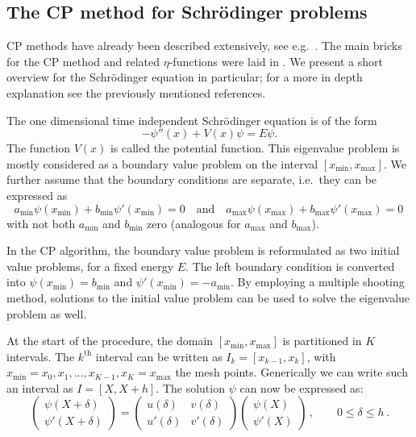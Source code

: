 \subsection{The CP method for Schrödinger problems}\label{the-method}

CP methods have already been described extensively, see e.g.\ \cite{ixaru_numerical_1984,ixaru_cp_1998,ixaru_cp_2000,ledoux_cp_2004}. The main bricks for the CP method and related $\eta$-functions were laid in \cite{ixaru_numerical_1984}. We present a short overview for the Schrödinger equation in particular; for a more in depth explanation see the previously mentioned references.

The one dimensional time independent Schrödinger equation is of the form
\[
    -\psi''(x) + V(x)\psi = E\psi\text{.}
\] The function $V(x)$ is called the potential function.
This eigenvalue problem is mostly considered as a boundary value problem on
the interval \([x_\text{min}, x_\text{max}]\). We further assume that the boundary
conditions are separate, i.e.\ they can be expressed as
\[
    a_\text{min} \psi(x_\text{min}) + b_\text{min}\psi'(x_\text{min}) = 0
    \quad \mbox{and} \quad
    a_\text{max} \psi(x_\text{max}) + b_\text{max}\psi'(x_\text{max}) = 0\,
\]
with not both $a_\text{min}$ and $b_\text{min}$ zero (analogous for $a_\text{max}$ and $b_\text{max}$).

In the CP algorithm, the boundary value problem is reformulated as two initial value problems, for a fixed
energy \(E\). The left boundary condition is converted into
\(\psi(x_\text{min}) = b_\text{min} \) and \(\psi'(x_\text{min}) = -a_\text{min}\). By
employing a multiple shooting method, solutions to the initial value
problem can be used to solve the eigenvalue problem as well.

At the start of the procedure, the domain \([x_\text{min}, x_\text{max}]\) is partitioned in \(K\)
intervals. The \(k^\text{th}\) interval can be written as
\(I_k = [x_{k-1}, x_{k}]\), with
\(x_\text{min} = x_0, x_1, \dots, x_{K-1}, x_{K} = x_\text{max}\) the
mesh points. Generically we can write such an interval as \(I = [X, X+h]\).
The solution \(\psi\) can now be expressed as:
\begin{equation}
    \begin{pmatrix}\psi(X+\delta) \\ \psi'(X+\delta)\end{pmatrix}
    = \begin{pmatrix} u(\delta) & v(\delta) \\ u'(\delta) & v'(\delta) \end{pmatrix} \begin{pmatrix} \psi(X) \\ \psi'(X) \end{pmatrix} \,, \qquad %
    0 \leq \delta \leq h \,. \label{eq:propmatrix}
\end{equation}

